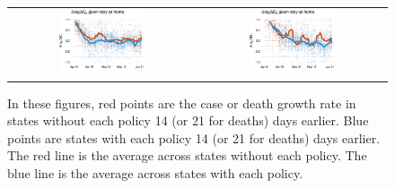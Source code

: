 \documentclass[3p, longtitle]{elsarticle}
\theoremstyle{definition}
\begin{document}
\begin{figure}
\begin{minipage}{\linewidth}
\begin{tabular}{cc}
      \\
      \includegraphics[width=0.483\textwidth]{tables_and_figures/pshelter-cases-14}
      &
        \includegraphics[width=0.483\textwidth]{tables_and_figures/pshelter-deaths-21}
      \\
    \end{tabular}
  \end{minipage}
     \begin{flushleft}
      \footnotesize In these figures, red points are the case or death
      growth rate in states without each policy 14 (or 21 for deaths)
      days earlier. Blue points are states with each policy 14 (or 21
      for deaths) days earlier. The red line is the average across
      states without each policy. The blue line is the average across
      states with each policy.    \end{flushleft}\end{figure}
\end{document}
